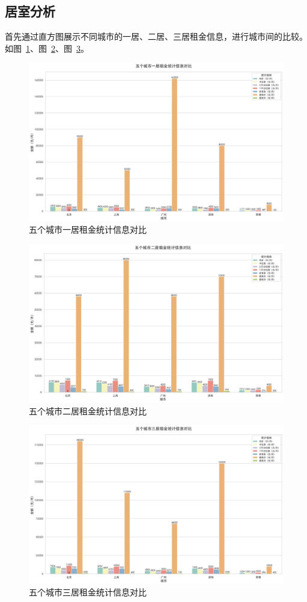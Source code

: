 \subsection{居室分析}
首先通过直方图展示不同城市的一居、二居、三居租金信息，进行城市间的比较。如图~\ref{fig:room_1_price_bar_chart}、图~\ref{fig:room_2_price_bar_chart}、图~\ref{fig:room_3_price_bar_chart}。
\begin{figure}[htbp]
    \centering
    \includegraphics[width=0.7\linewidth]{../../figure/room_1_price_bar_chart.png}
    \caption{五个城市一居租金统计信息对比}
    \label{fig:room_1_price_bar_chart}
\end{figure}
\begin{figure}[htbp]
    \centering
    \includegraphics[width=0.7\linewidth]{../../figure/room_2_price_bar_chart.png}
    \caption{五个城市二居租金统计信息对比}
    \label{fig:room_2_price_bar_chart}
\end{figure}
\begin{figure}[htbp]
    \centering
    \includegraphics[width=0.7\linewidth]{../../figure/room_3_price_bar_chart.png}
    \caption{五个城市三居租金统计信息对比}
    \label{fig:room_3_price_bar_chart}
\end{figure}

